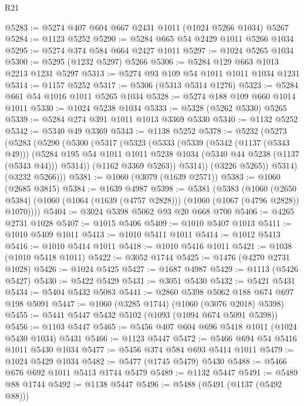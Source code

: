 \begin{lexlean}{R21}
\begin{coremodule}
@5283 := @5274 @407 @604 @667 @2431 @1011 (@1024 @5266 @1034) @5267
@5284 := @1123 @5252
@5290 := @5284 @665 @54 @2429 @1011 @5266 @1034
@5295 := @5274 @374 @584 @664 @2427 @1011
@5297 := @1024 @5265 @1034
@5300 := @5295 (@1232 @5297) @5266
@5306 := @5284 @129 @663 @1013 @2213 @1231 @5297
@5313 := @5274 @93 @109 @54 @1011 @1011 @1034 @1231
@5314 := @1157 @5252
@5317 := @5306 (@5313 @5314 @1276)
@5323 := @5284 @661 @54 @1016 @1011 @5265 @1034
@5328 := @5274 @188 @109 @660 @1014 @1011
@5330 := @1024 @5238 @1034
@5333 := @5328 (@5262 @5330) @5265
@5339 := @5284 @274 @391 @1011 @1013 @3369 @5330
@5340 := @1132 @5252
@5342 := @5340 @49 @3369
@5343 := @1138 @5252
@5378 := @5232
    (@5273
      (@5283
        (@5290
          (@5300
            (@5317
              (@5323
                (@5333
                  (@5339
                    (@5342 (@1137 (@5343 @49)))
                    (@5284
                      @195
                      @54
                      @1011
                      @1011
                      @5238
                      @1034
                      (@5340 @44 @5238 (@1137 (@5343 @44)))
                      @5314))
                  (@1162 @3369 @5263))
                @5314))
            (@3226 @5265))
          @5314)
        (@3232 @5266)))
@5381 := @1060 (@3079 (@1639 @2571))
@5383 := @1060 (@2685 @3815)
@5384 := @1639 @4987
@5398 := @5381
    (@5383
      (@1060
        (@2650 @5384)
        (@1060 (@1064 (@1639 (@4757 @2828))) (@1060 (@1067 (@4796 @2828)) @1070))))
@5404 := @3024 @5398 @5062 @93 @20 @668 @700
@5406 := @4265 @2731 @1028
@5407 := @1015 @5406
@5409 := @1010 @5407 @1013
@5411 := @1010 @5409 @1011
@5413 := @1010 @5411 @1011
@5414 := @1012 @5413
@5416 := @1010 @5414 @1011
@5418 := @1010 @5416 @1011
@5421 := @1038 (@1010 @5418 @1011)
@5422 := @3052 @1744
@5425 := @1476 (@4270 @2731 @1028)
@5426 := @1024 @5425
@5427 := @1687 @4987
@5429 := @1113 (@5426 @5427)
@5430 := @5422 @5429
@5431 := @3051 @5430
@5432 := @5421 @5431
@5434 := @5404 @5432 @5083
@5441 := @2860 @5398 @5062 @188 @674 @697 @198 @5091
@5447 := @1060 (@3285 @1744) (@1060 (@3076 @2018) @5398)
@5455 := @5441 @5447 @5432 @5102 (@1093 (@1094 @674 @5091 @5398))
@5456 := @1103 @5447
@5465 := @5456 @407 @604 @696 @5418 @1011 (@1024 @5430 @1034) @5431
@5466 := @1123 @5447
@5472 := @5466 @694 @54 @5416 @1011 @5430 @1034
@5477 := @5456 @374 @584 @693 @5414 @1011
@5479 := @1024 @5429 @1034
@5482 := @5477 (@1745 @5479) @5430
@5488 := @5466 @676 @692 @1011 @5413 @1744 @5479
@5489 := @1132 @5447
@5491 := @5489 @88 @1744
@5492 := @1138 @5447
@5496 := @5488 (@5491 (@1137 (@5492 @88)))

\end{coremodule}
\end{lexlean}
